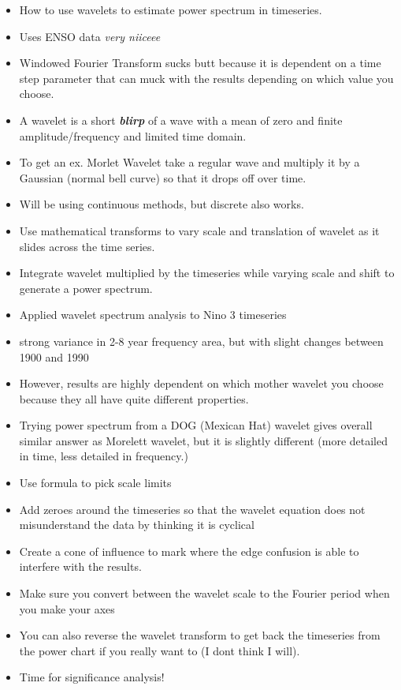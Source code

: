 \documentclass[11pt]{article}
\begin{document}
\begin{itemize}
\item How to use wavelets to estimate power spectrum in timeseries.
\item Uses ENSO data \emph{very niiceee}
\item Windowed Fourier Transform sucks butt because it is dependent on a time step parameter that can muck with the results depending on which value you choose.
\item A wavelet is a short \textbf{\emph{blirp}} of a wave with a mean of zero and finite amplitude/frequency and limited time domain.
\item To get an ex. Morlet Wavelet take a regular wave and multiply it by a Gaussian (normal bell curve) so that it drops off over time.
\item Will be using continuous methods, but discrete also works.
\item Use mathematical transforms to vary scale and translation of wavelet as it slides across the time series.
\item Integrate wavelet multiplied by the timeseries while varying scale and shift to generate a power spectrum.
\item Applied wavelet spectrum analysis to Nino 3 timeseries
\item strong variance in 2-8 year frequency area, but with slight changes between 1900 and 1990
\item However, results are highly dependent on which mother wavelet you choose because they all have quite different properties.
\item Trying power spectrum from a DOG (Mexican Hat) wavelet gives overall similar answer as Morelett wavelet, but it is slightly different (more detailed in time, less detailed in frequency.)
\item Use formula to pick scale limits
\item Add zeroes around the timeseries so that the wavelet equation does not misunderstand the data by thinking it is cyclical
\item Create a cone of influence to mark where the edge confusion is able to interfere with the results.
\item Make sure you convert between the wavelet scale to the Fourier period when you make your axes
\item You can also reverse the wavelet transform to get back the timeseries from the power chart if you really want to (I dont think I will).
\item Time for significance analysis!

\end{itemize}
\end{document}
